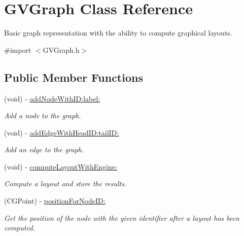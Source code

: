 \hypertarget{interface_g_v_graph}{
\section{GVGraph Class Reference}
\label{interface_g_v_graph}
}


Basic graph representation with the ability to compute graphical layouts.  




{\ttfamily \#import $<$GVGraph.h$>$}

\subsection*{Public Member Functions}
\begin{DoxyCompactItemize}
\item 
(void) -\/ \hyperlink{interface_g_v_graph_a0b1eb84a6b2ceeb2a052d659ff260489}{addNodeWithID:label:}
\begin{DoxyCompactList}\small\item\em Add a node to the graph. \end{DoxyCompactList}\item 
(void) -\/ \hyperlink{interface_g_v_graph_a7ca357ae11b84c38d726feacc4ee0aae}{addEdgeWithHeadID:tailID:}
\begin{DoxyCompactList}\small\item\em Add an edge to the graph. \end{DoxyCompactList}\item 
\hypertarget{interface_g_v_graph_af7dd4b94d29c2771e1003d4f8948249b}{
(void) -\/ \hyperlink{interface_g_v_graph_af7dd4b94d29c2771e1003d4f8948249b}{computeLayoutWithEngine:}}
\label{interface_g_v_graph_af7dd4b94d29c2771e1003d4f8948249b}

\begin{DoxyCompactList}\small\item\em Compute a layout and store the results. \end{DoxyCompactList}\item 
\hypertarget{interface_g_v_graph_a1646a5fd76cc914a66aea07c0cb871ea}{
(CGPoint) -\/ \hyperlink{interface_g_v_graph_a1646a5fd76cc914a66aea07c0cb871ea}{positionForNodeID:}}
\label{interface_g_v_graph_a1646a5fd76cc914a66aea07c0cb871ea}

\begin{DoxyCompactList}\small\item\em Get the position of the node with the given identifier after a layout has been computed. \end{DoxyCompactList}\end{DoxyCompactItemize}
